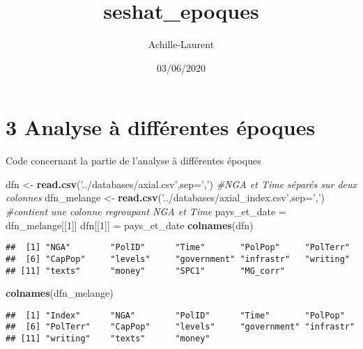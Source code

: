 \documentclass[
]{article}
\title{seshat\_epoques}
\author{Achille-Laurent}
\date{03/06/2020}
\newenvironment{Shaded}{\begin{snugshade}}{\end{snugshade}}
\newcommand{\CommentTok}[1]{\textcolor[rgb]{0.56,0.35,0.01}{\textit{#1}}}
\newcommand{\DataTypeTok}[1]{\textcolor[rgb]{0.13,0.29,0.53}{#1}}
\newcommand{\DecValTok}[1]{\textcolor[rgb]{0.00,0.00,0.81}{#1}}
\newcommand{\KeywordTok}[1]{\textcolor[rgb]{0.13,0.29,0.53}{\textbf{#1}}}
\newcommand{\NormalTok}[1]{#1}
\newcommand{\StringTok}[1]{\textcolor[rgb]{0.31,0.60,0.02}{#1}}
\begin{document}
\maketitle

\hypertarget{analyse-uxe0-diffuxe9rentes-uxe9poques}{%
\section{3 Analyse à différentes
époques}\label{analyse-uxe0-diffuxe9rentes-uxe9poques}}

Code concernant la partie de l'analyse à différentes époques

\begin{Shaded}
\begin{Highlighting}[]
\NormalTok{dfn <-}\StringTok{ }\KeywordTok{read.csv}\NormalTok{(}\StringTok{'../databases/axial.csv'}\NormalTok{,}\DataTypeTok{sep=}\StringTok{','}\NormalTok{) }\CommentTok{#NGA et Time séparés sur deux colonnes}
\NormalTok{dfn_melange <-}\StringTok{ }\KeywordTok{read.csv}\NormalTok{(}\StringTok{'../databases/axial_index.csv'}\NormalTok{,}\DataTypeTok{sep=}\StringTok{','}\NormalTok{) }\CommentTok{#contient une colonne regroupant NGA et Time}
\NormalTok{pays_et_date =}\StringTok{ }\NormalTok{dfn_melange[[}\DecValTok{1}\NormalTok{]]}
\NormalTok{dfn[[}\DecValTok{1}\NormalTok{]] =}\StringTok{ }\NormalTok{pays_et_date}
\KeywordTok{colnames}\NormalTok{(dfn)}
\end{Highlighting}
\end{Shaded}

\begin{verbatim}
##  [1] "NGA"        "PolID"      "Time"       "PolPop"     "PolTerr"   
##  [6] "CapPop"     "levels"     "government" "infrastr"   "writing"   
## [11] "texts"      "money"      "SPC1"       "MG_corr"
\end{verbatim}

\begin{Shaded}
\begin{Highlighting}[]
\KeywordTok{colnames}\NormalTok{(dfn_melange)}
\end{Highlighting}
\end{Shaded}

\begin{verbatim}
##  [1] "Index"      "NGA"        "PolID"      "Time"       "PolPop"    
##  [6] "PolTerr"    "CapPop"     "levels"     "government" "infrastr"  
## [11] "writing"    "texts"      "money"
\end{verbatim}
\end{document}
